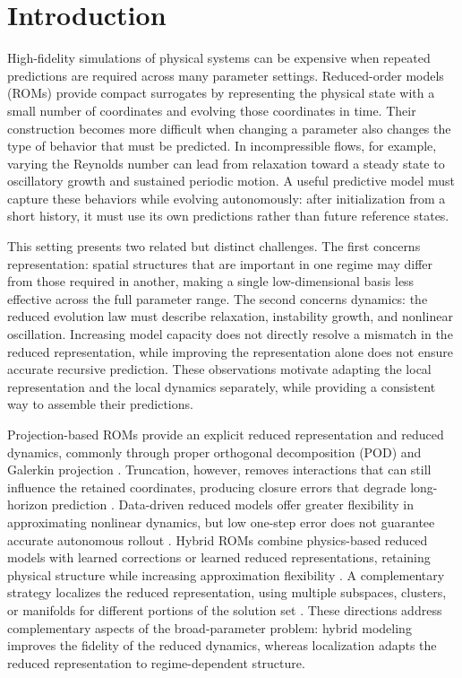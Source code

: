 \section{Introduction}

High-fidelity simulations of physical systems can be expensive when repeated predictions are required across many parameter settings. Reduced-order models (ROMs) provide compact surrogates by representing the physical state with a small number of coordinates and evolving those coordinates in time. Their construction becomes more difficult when changing a parameter also changes the type of behavior that must be predicted. In incompressible flows, for example, varying the Reynolds number can lead from relaxation toward a steady state to oscillatory growth and sustained periodic motion. A useful predictive model must capture these behaviors while evolving autonomously: after initialization from a short history, it must use its own predictions rather than future reference states.

This setting presents two related but distinct challenges. The first concerns representation: spatial structures that are important in one regime may differ from those required in another, making a single low-dimensional basis less effective across the full parameter range. The second concerns dynamics: the reduced evolution law must describe relaxation, instability growth, and nonlinear oscillation. Increasing model capacity does not directly resolve a mismatch in the reduced representation, while improving the representation alone does not ensure accurate recursive prediction. These observations motivate adapting the local representation and the local dynamics separately, while providing a consistent way to assemble their predictions.

Projection-based ROMs provide an explicit reduced representation and reduced dynamics, commonly through proper orthogonal decomposition (POD) and
Galerkin projection \citep{sirovich1987,berkooz1993,benner2015}. Truncation, however, removes interactions that can still influence the retained coordinates, producing closure errors that degrade long-horizon prediction \citep{amsallem2012}. Data-driven reduced models offer greater flexibility in approximating nonlinear dynamics, but low one-step error does not guarantee accurate autonomous rollout \citep{vlachas2018,duraisamy2019,brunton2020}. Hybrid ROMs combine physics-based reduced models with learned corrections or learned reduced representations, retaining physical structure while increasing approximation flexibility
\citep{dar2023,lee2020,fresca2022,geelen2023}. A complementary strategy localizes the reduced representation, using multiple subspaces, clusters, or manifolds for different portions of the solution set \citep{kaiser2014,li2021cluster,diaz2024}. These directions address complementary aspects of the broad-parameter problem: hybrid modeling improves the fidelity of the reduced dynamics, whereas localization adapts the reduced representation to regime-dependent structure.

